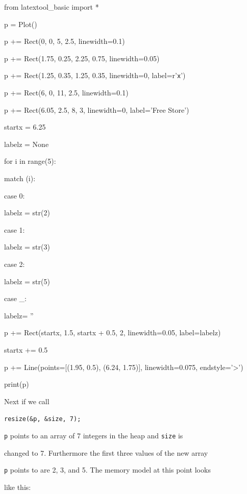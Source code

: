 \begin{python}

from latextool_basic import *

p = Plot()

p += Rect(0, 0, 5, 2.5, linewidth=0.1)

p += Rect(1.75, 0.25, 2.25, 0.75, linewidth=0.05)

p += Rect(1.25, 0.35, 1.25, 0.35, linewidth=0, label=r'\texttt{x}')



p += Rect(6, 0, 11, 2.5, linewidth=0.1)

p += Rect(6.05, 2.5, 8, 3, linewidth=0, label='Free Store')

startx = 6.25

labelz = None

for i in range(5):

    match (i):

          case 0:

               labelz = str(2)

          case 1:

               labelz = str(3)

          case 2:

               labelz = str(5)

          case _:

               labelz= ''

    p += Rect(startx, 1.5, startx + 0.5, 2, linewidth=0.05, label=labelz)

    startx += 0.5

p += Line(points=[(1.95, 0.5), (6.24, 1.75)], linewidth=0.075, endstyle='>')

print(p)

\end{python}

Next if we call



\verb!resize(&p, &size, 7);!



\texttt{p} points to an array of 7 integers in the heap and \texttt{size} is

changed to 7. Furthermore the first three values of the new array

\texttt{p} points to are 2, 3, and 5. The memory model at this point looks

like this:



